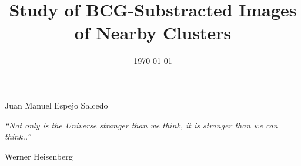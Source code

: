 \documentclass[a4paper, 11pt, oneside]{Thesis}  %
\begin{document}
\frontmatter      %

\title  {Study of BCG-Substracted Images of Nearby Clusters}
            
\authors  
            {{Juan Manuel Espejo Salcedo}}
            
           
\addresses  {\groupname\\\deptname\\\univname}  %
\date       {\today}
\subject    {}
\keywords   {}

\maketitle


\fancyhead{}  %
\rhead{\thepage}  %
\lhead{}  %

\pagestyle{fancy}  %

\pagestyle{empty}  %

\null\vfill
\textit{``Not only is the Universe stranger than we think, it is stranger than we can think..''}

\begin{flushright}
Werner Heisenberg
\end{flushright}

\vfill\vfill\vfill\vfill\vfill\vfill\null
\clearpage  %
\end{document}
